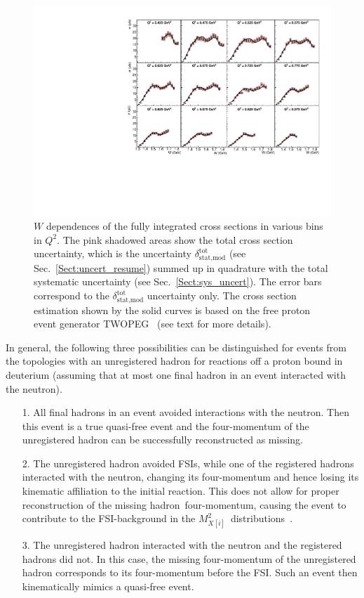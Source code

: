 \documentclass[prc,twocolumn,superscriptaddress,showpacs,amssymb,amsmath,amsfonts,aps,nofootinbib]{revtex4-1}
\begin{document}
\begin{figure}[htp]
\begin{center}
\includegraphics[width=16.25cm]{pictures/w_dep_model2.pdf}
\caption{\small $W$ dependences of the fully integrated cross sections in various bins in $Q^{2}$. The pink shadowed areas show the total cross section uncertainty, which is the uncertainty $\delta_{\text{stat,mod}}^{\text{tot}}$ (see Sec.\!~\ref{Sect:uncert_resume}) summed up in quadrature with the total systematic uncertainty (see Sec.\!~\ref{Sect:sys_uncert}). The error bars correspond to the $\delta_{\text{stat,mod}}^{\text{tot}}$ uncertainty only. The cross section estimation shown by the solid curves is based on the free proton event generator TWOPEG~\cite{twopeg} (see text for more details).} \label{fig:w_dep_model}
\end{center}
\end{figure}




In general, the following three possibilities can be distinguished for events from the topologies with an unregistered hadron for reactions off a proton bound in deuterium (assuming that at most one final hadron in an event interacted with the neutron).

\begin{itemize}
\item[1.] All final hadrons in an event avoided interactions with the neutron. Then this event is a true quasi-free event and the four-momentum of the unregistered hadron can be successfully reconstructed as missing.
\item[2.] The unregistered hadron avoided FSIs, while one of the registered hadrons interacted with the neutron, changing its four-momentum and hence losing its kinematic affiliation to the initial reaction. This does not allow for proper reconstruction of the missing hadron~four-momentum, causing the event to contribute to the FSI-background in the $M^{2}_{X[i]}$~distributions~\cite{note_mm_distr}.
\item[3.] The unregistered hadron interacted with the neutron and the registered hadrons did not. In this case, the missing four-momentum of the unregistered hadron corresponds to its four-momentum before the FSI. Such an event then kinematically mimics a quasi-free event.
\end{itemize}
\end{document}
